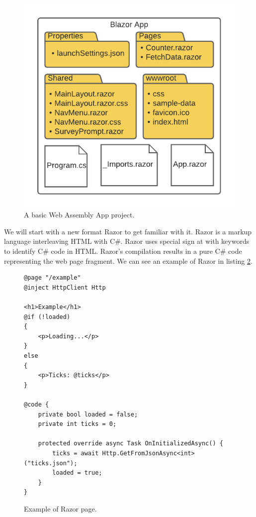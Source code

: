 \begin{figure}[H]\centering
\includegraphics{./img/ProjectStructure}
\caption{A basic Web Assembly App project.}
\label{img01:project}
\end{figure} 
\par
We will start with a new format Razor to get familiar with it.
Razor is a markup language interleaving HTML with C\#.
Razor uses special sign at with keywords to identify C\# code in HTML.
Razor's compilation results in a pure C\# code representing the web page fragment.
We can see an example of Razor in listing \ref{img04:razor}.
\par
\begin{figure}
\begin{lstlisting}
@page "/example"
@inject HttpClient Http

<h1>Example</h1>
@if (!loaded)
{
    <p>Loading...</p>
}
else
{
    <p>Ticks: @ticks</p>
}

@code {
    private bool loaded = false;
    private int ticks = 0;

    protected override async Task OnInitializedAsync() {
        ticks = await Http.GetFromJsonAsync<int>("ticks.json");
        loaded = true;
    }
}
\end{lstlisting}
\caption{Example of Razor page.}
\label{img04:razor}
\end{figure}
\par

